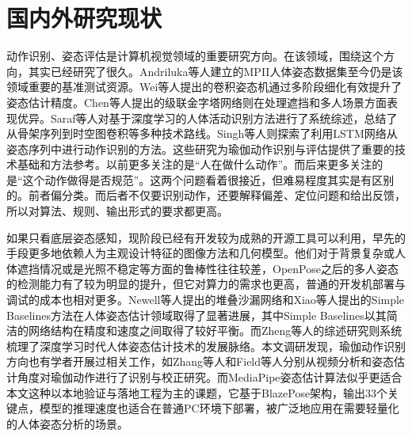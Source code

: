 \documentclass[UTF8,twoside]{ctexrep}
\makeatletter
\def@NAT@last@yr{\@citea}%
\def@NAT@last@yr{-\NAT@penalty}%
\makeatother
\begin{document}
\section{国内外研究现状}
动作识别、姿态评估是计算机视觉领域的重要研究方向。在该领域，围绕这个方向，其实已经研究了很久。Andriluka等人\cite{ref_mpii}建立的MPII人体姿态数据集至今仍是该领域重要的基准测试资源。Wei等人\cite{ref_cpm}提出的卷积姿态机通过多阶段细化有效提升了姿态估计精度。Chen等人\cite{ref_cpn}提出的级联金字塔网络则在处理遮挡和多人场景方面表现优异。Saraf等人\cite{ref_har_survey}对基于深度学习的人体活动识别方法进行了系统综述，总结了从骨架序列到时空图卷积等多种技术路线。Singh等人\cite{ref_lstm_pose_action}则探索了利用LSTM网络从姿态序列中进行动作识别的方法。这些研究为瑜伽动作识别与评估提供了重要的技术基础和方法参考。以前更多关注的是“人在做什么动作”。而后来更多关注的是“这个动作做得是否规范”。这两个问题看着很接近，但难易程度其实是有区别的。前者偏分类。而后者不仅要识别动作，还要解释偏差、定位问题和给出反馈，所以对算法、规则、输出形式的要求都更高。

如果只看底层姿态感知，现阶段已经有开发较为成熟的开源工具可以利用，早先的手段更多地依赖人为主观设计特征的图像方法和几何模型。他们对于背景复杂或人体遮挡情况或是光照不稳定等方面的鲁棒性往往较差，OpenPose\cite{ref_openpose}之后的多人姿态的检测能力有了较为明显的提升，但它对算力的需求也更高，普通的开发机部署与调试的成本也相对更多。Newell等人\cite{ref_hourglass}提出的堆叠沙漏网络和Xiao等人\cite{ref_simple_baselines}提出的Simple Baselines方法在人体姿态估计领域取得了显著进展，其中Simple Baselines以其简洁的网络结构在精度和速度之间取得了较好平衡。而Zheng等人\cite{ref_pose_survey}的综述研究则系统梳理了深度学习时代人体姿态估计技术的发展脉络。本文调研发现，瑜伽动作识别方向也有学者开展过相关工作，如Zhang等人\cite{ref_yoga_recognition}和Field等人\cite{ref_yoga_pose_estimation}分别从视频分析和姿态估计角度对瑜伽动作进行了识别与校正研究。而MediaPipe姿态估计算法\cite{ref_mediapipe}似乎更适合本文这种以本地验证与落地工程为主的课题，它基于BlazePose架构，输出33个关键点，模型的推理速度也适合在普通PC环境下部署，被广泛地应用在需要轻量化的人体姿态分析的场景。
\end{document}
